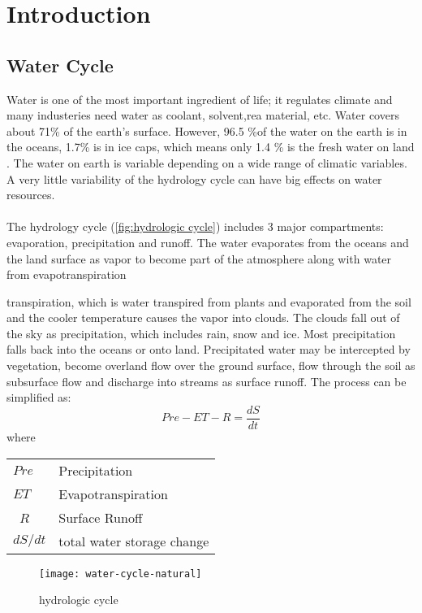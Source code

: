 \chapter{Introduction}
\section{Water Cycle}
Water is one of the most important ingredient of life; it regulates climate and many industeries need water as coolant, solvent,rea material, etc. Water covers about 71\% of the earth's surface. However, 96.5 \%of the water on the earth is in the oceans, 1.7\% is in ice caps, which means only 1.4 \% is the fresh water on land \cite{gleick1993water}. The water on earth is variable depending on a wide range of climatic variables. A very little variability of the hydrology cycle can have big effects on water resources. \cite{evans1996effects}\\\\
The hydrology cycle (\autoref{fig:hydrologic cycle}) includes 3 major compartments: evaporation, precipitation and runoff. The water evaporates from the oceans and the land surface as vapor to become part of the atmosphere along with water from evapotranspiration

transpiration, which is water transpired from plants and evaporated from the soil and the cooler temperature causes the vapor into clouds. The clouds fall out of the sky as precipitation, which includes rain, snow and ice. Most precipitation falls back into the oceans or onto land. Precipitated water may be intercepted by vegetation, become overland flow over the ground surface, flow through the soil as subsurface flow and discharge into streams as surface runoff. The process can be simplified as:
\begin{equation}
	 Pre - ET - R = \frac{dS}{dt}
\end{equation}
where
\begin{table}[htbp]
	\begin{tabular}{ll}
		$Pre$   & Precipitation    \\ 
		$ET$    & Evapotranspiration \\ \
		$R$     & Surface Runoff \\ 
		$dS / dt$ & total water storage change \\ 
	\end{tabular}
\end{table}
\begin{figure}[htbp]
	\centering
	\texttt{[image: water-cycle-natural]} %
	\caption{hydrologic cycle} 
	\label{fig:hydrologic cycle}
\end{figure}
